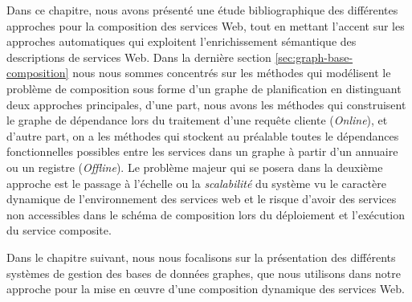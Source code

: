 Dans ce chapitre, nous avons présenté une étude bibliographique des
différentes approches pour la composition des services Web, tout en
mettant l'accent sur les approches automatiques qui exploitent
l'enrichissement sémantique des descriptions de services Web. Dans la
dernière section \ref{sec:graph-base-composition} nous nous sommes
concentrés sur les méthodes qui modélisent le problème de composition
sous forme d'un graphe de planification en distinguant deux approches
principales, d'une part, nous avons les méthodes qui construisent le
graphe de dépendance lors du traitement d'une requête cliente
(\textit{Online}), et d'autre part, on a les méthodes qui stockent au
préalable toutes le dépendances fonctionnelles possibles entre les
services dans un graphe à partir d'un annuaire ou un registre
(\textit{Offline}). Le problème majeur qui se posera dans la deuxième
approche est le passage à l'échelle ou la \textit{scalabilité} du
système vu le caractère dynamique de l'environnement des services web
et le risque d'avoir des services non accessibles dans le schéma de
composition lors du déploiement et l'exécution du service
composite.\medskip

Dans le chapitre suivant, nous nous focalisons sur la présentation des
différents systèmes de gestion des bases de données graphes, que nous
utilisons dans notre approche pour la mise en œuvre d'une composition
dynamique des services Web.

